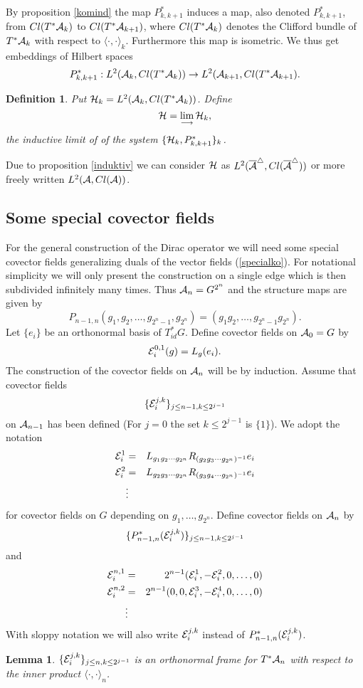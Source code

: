 \documentclass[12pt]{article}
\def\ca{{\cal A}}
\def\ce{{\cal E}}
\def\ch{{\cal H}}
\newtheorem{lemma}[thm]{Lemma}
\newtheorem{definition}[thm]{Definition}
\begin{document}
{By proposition \ref{komind} the map $P_{k, k+1}^*$ induces a map, also denoted $P_{k ,k+1}^*$, from $Cl(T^*\ca_{k})$ to $Cl( T^*\ca_{k+1})$, where $Cl(T^*\ca_{k})$ denotes the Clifford bundle of $T^*\ca_{k}$ with respect to $\langle \cdot ,\cdot \rangle_{k}$. Furthermore this map is isometric. We thus get embeddings of Hilbert spaces
$$P^*_{k,k+1}:L^2(\ca_{k},Cl(T^*\ca_{k}))\to L^2(\ca_{k+1},Cl(T^*\ca_{k+1}).$$

\begin{definition}
Put $\ch_k=L^2(\ca_{k},Cl(T^*\ca_{k}))$. Define
$$\ch =\lim_{\longrightarrow }\ch_k,$$
the inductive limit of of the system $\{\ch_k, P_{k,k+1}^*\}_k$.
\end{definition}

Due to proposition \ref{induktiv} we can consider $\ch$ as $L^2(\overline{\ca}^\triangle ,Cl(\overline{\ca}^\triangle ))$ or more freely written $L^2(\ca,Cl(\ca))$.


\subsection{Some special covector fields}

For the general construction of the Dirac operator we will need some special covector fields generalizing duals of the vector fields (\ref{specialko}). For notational simplicity we will only present the construction on a single edge which is then subdivided infinitely many times. Thus 
$\ca_{n}=G^{2^n}$ and the structure maps are given by
$$P_{n-1,n} (g_1,g_2,\ldots,g_{2^n-1},g_{2^n})=(g_1g_2,\ldots, g_{2^n-1}g_{2^n}).$$
Let $\{ e_i\}$ be an orthonormal basis of $T_{id}^*G$. Define covector fields on $\ca_{0}=G$ by
$$\ce_i^{0,1}(g)=L_g(e_i).$$
The construction of the covector fields on $\ca_n$ will be by induction. Assume that  covector fields $$\{\ce_i^{j,k}\}_{j\leq n-1,k\leq 2^{j-1}}$$ on $\ca_{n-1}$ 
has been defined (For $j=0$ the set $k\leq 2^{j-1}$ is $\{ 1\}$). We adopt the notation
\begin{eqnarray*}
\ce^1_i &=&L_{g_1g_2\cdots g_{2^n}}R_{(g_2g_3\cdots g_{2^n})^{-1}}e_i\\
\ce^2_i &=&L_{g_2g_3\cdots g_{2^n}}R_{(g_3g_4\cdots g_{2^n})^{-1}}e_i\\
&\vdots
\end{eqnarray*}
for covector fields on $G$ depending on $g_1,\ldots ,g_{2^n}$.
Define covector fields on $\ca_{n}$ by
$$\{P_{n-1,n}^*(\ce_i^{j,k})\}_{j\leq n-1,k\leq 2^{j-1}}$$
and 
\begin{eqnarray*}
\ce^{n,1}_i &=&2^{n-1}(\ce_i^1,-\ce_i^2,0,\ldots,0)\\
\ce^{n,2}_i &=&2^{n-1}(0,0,\ce_i^3,-\ce_i^4,0,\ldots,0)\\
&\vdots
\end{eqnarray*}
With sloppy notation we will also write $\ce_i^{j,k}$ instead of $P_{n-1,n}^*(\ce_i^{j,k})$. 
\begin{lemma}
$\{\ce_i^{j,k}\}_{j\leq n,k\leq 2^{j-1}}$ is an orthonormal frame for $T^*\ca_{n}$ with respect to the inner product $\langle \cdot ,\cdot\rangle_{n}$.
\end{lemma}

}
\end{document}
